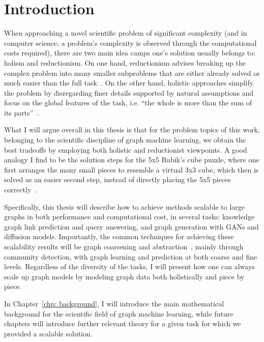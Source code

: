 \chapter{Introduction}
\label{chp: introduction}

When approaching a novel scientific problem of significant complexity (and in computer science, a problem's complexity is observed through the computational costs required), there are two main idea camps one's solution usually belongs to: holism and reductionism. On one hand, reductionism advises breaking up the complex problem into many smaller subproblems that are either already solved or much easier than the full task~\cite{doniger_merriam-websters_1999, kricheldorf_getting_2016}. On the other hand, holistic approaches simplify the problem by disregarding finer details supported by natural assumptions and focus on the global features of the task, i.e. \enquote{the whole is more than the sum of its parts}~\cite{marshall_unity_2002, noauthor_what_2022}. 

What I will argue overall in this thesis is that for the problem topics of this work, belonging to the scientific discipline of graph machine learning, we obtain the best tradeoffs by employing both holistic and reductionist viewpoints. A good analogy I find to be the solution steps for the 5x5 Rubik's cube puzzle, where one first arranges the many small pieces to resemble a virtual 3x3 cube, which then is solved as an easier second step, instead of directly placing the 5x5 pieces correctly~\cite{guangzhou_ganyuan_intelligent_technology_co_ltd_5x5_nodate}.

Specifically, this thesis will describe how to achieve methods scalable to large graphs in both performance and computational cost, in several tasks: knowledge graph link prediction and query answering, and graph generation with GANs and diffusion models. Importantly, the common techniques for achieving these scalability results will be graph coarsening and abstraction~\cite{boneva_graph_2007}, mainly through community detection, with graph learning and prediction at both coarse and fine levels. Regardless of the diversity of the tasks, I will present how one can always scale up graph models by modeling graph data both holistically and piece by piece.

In Chapter~\ref{chp: background}, I will introduce the main mathematical background for the scientific field of graph machine learning, while future chapters will introduce further relevant theory for a given task for which we provided a scalable solution. 

